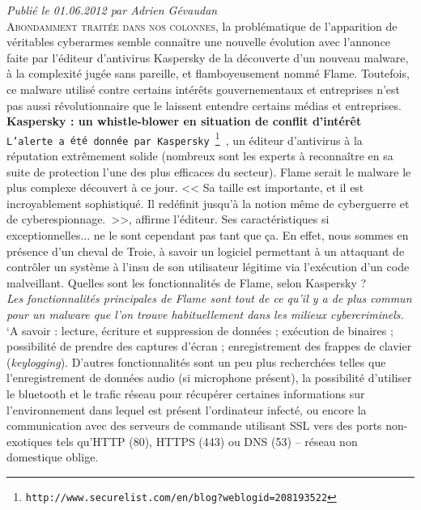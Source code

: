 \documentclass[11pt,twoside,a4paper]{article}
\begin{document}
\emph{\small Publi{\'e} le 01.06.2012 par Adrien G{\'e}vaudan}~\\

\lettrine{A}{bondamment trait{\'e}e dans nos colonnes}, la probl{\'e}matique de l'apparition de v{\'e}ritables cyberarmes semble conna{\^i}tre une nouvelle {\'e}volution avec l'annonce faite par l'{\'e}diteur d'antivirus Kaspersky de la d{\'e}couverte d'un nouveau malware, {\`a} la complexit{\'e} jug{\'e}e sans pareille, et flamboyeusement nomm{\'e} Flame. Toutefois, ce malware utilis{\'e} contre certains int{\'e}r{\^e}ts gouvernementaux et entreprises n'est pas aussi r{\'e}volutionnaire que le laissent entendre certains m{\'e}dias et entreprises.~\\

\textbf{\large Kaspersky : un whistle-blower en situation de conflit d'int{\'e}r{\^e}t}~\\

\texttt{L'alerte a {\'e}t{\'e} donn{\'e}e par Kaspersky~\footnote{\texttt{http://www.securelist.com/en/blog?weblogid=208193522}} }, un {\'e}diteur d'antivirus {\`a} la r{\'e}putation extr{\^e}mement solide (nombreux sont les experts {\`a} reconna{\^i}tre en sa suite de protection l'une des plus efficaces du secteur). Flame serait le malware le plus complexe d{\'e}couvert {\`a} ce jour. << Sa taille est importante, et il est incroyablement sophistiqu{\'e}. Il red{\'e}finit jusqu'{\`a} la notion m{\^e}me de cyberguerre et de cyberespionnage.~\footnotemark[10] >>, affirme l'{\'e}diteur. Ses caract{\'e}ristiques si exceptionnelles... ne le sont cependant pas tant que \c{c}a. En effet, nous sommes en pr{\'e}sence d'un cheval de Troie, {\`a} savoir un logiciel permettant {\`a} un attaquant de contr{\^o}ler un syst{\`e}me {\`a} l'insu de son utilisateur l{\'e}gitime via l'ex{\'e}cution d'un code malveillant. Quelles sont les fonctionnalit{\'e}s de Flame, selon Kaspersky ?~\\

\emph{Les fonctionnalit{\'e}s principales de Flame sont tout de ce qu'il y a de plus commun pour un malware que l'on trouve habituellement dans les milieux cybercriminels.}~\\

{`A} savoir : lecture, {\'e}criture et suppression de donn{\'e}es ; ex{\'e}cution de binaires ; possibilit{\'e} de prendre des captures d'{\'e}cran ; enregistrement des frappes de clavier (\emph{keylogging}). D'autres fonctionnalit{\'e}s sont un peu plus recherch{\'e}es telles que l'enregistrement de donn{\'e}es audio (si microphone pr{\'e}sent), la possibilit{\'e} d'utiliser le bluetooth et le trafic r{\'e}seau pour r{\'e}cup{\'e}rer certaines informations sur l'environnement dans lequel est pr{\'e}sent l'ordinateur infect{\'e}, ou encore la communication avec des serveurs de commande utilisant SSL vers des ports non-exotiques tels qu'HTTP (80), HTTPS (443) ou DNS (53) -- r{\'e}seau non domestique oblige.~\\
\end{document}
